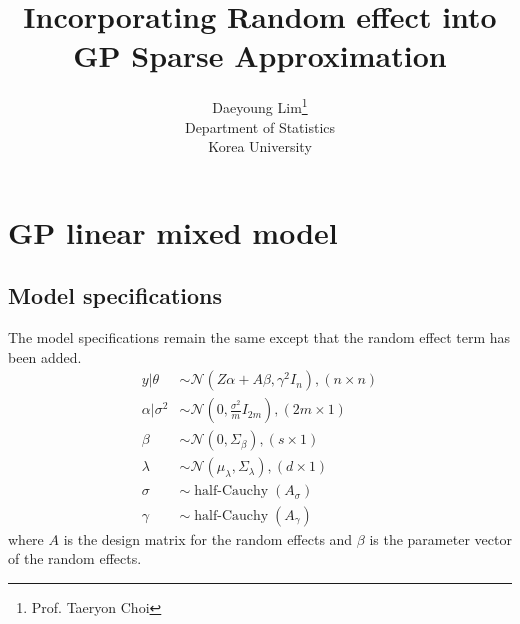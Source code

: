 \documentclass[11pt]{article}
\newcommand{\opn}{\operatorname}
\begin{document}
\nocite{*}

\title{Incorporating Random effect into GP Sparse Approximation}

\author{Daeyoung Lim\thanks{Prof. Taeryon Choi} \\
Department of Statistics \\
Korea University}

\maketitle

\section{GP linear mixed model}
\subsection{Model specifications}
The model specifications remain the same except that the random effect term has been added.
\begin{align*}
  y|\theta &\sim \mathcal{N}\left(Z\alpha + A\beta, \gamma^{2}I_{n}\right), (n\times n) \\
  \alpha|\sigma^{2} &\sim \mathcal{N}\left(0, \frac{\sigma^{2}}{m}I_{2m}\right), (2m\times 1) \\
  \beta &\sim \mathcal{N}\left(0, \Sigma_{\beta}\right), (s\times 1)  \\
  \lambda &\sim \mathcal{N}\left(\mu_{\lambda}, \Sigma_{\lambda}\right), (d \times 1)\\
  \sigma &\sim \opn{half-Cauchy}\left(A_{\sigma}\right)\\
  \gamma &\sim \opn{half-Cauchy}\left(A_{\gamma}\right)
\end{align*}
where $A$ is the design matrix for the random effects and $\beta$ is the parameter vector of the random effects.
\end{document}
